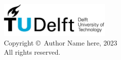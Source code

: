\begin{flushleft}
  \vspace*{15cm}
  \thispagestyle{empty}
  \noindent%
  \includegraphics[width=55mm]{layout/tudelft/logo.png}\\  
  Copyright \copyright\ Author Name here, 2023 \\
  All rights reserved.
\end{flushleft}